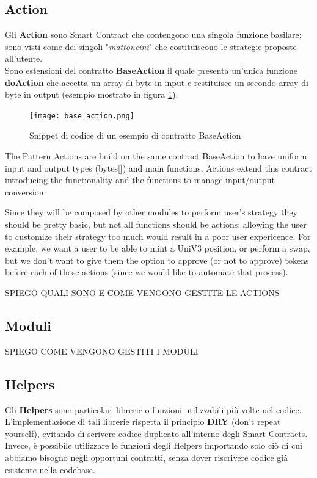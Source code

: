 \documentclass[12pt,a4paper]{report}
\begin{document}
\subsection{Action}

Gli \textbf{Action} sono Smart Contract che contengono una singola funzione basilare; sono visti come dei singoli "\textit{mattoncini}" che costituiscono le strategie proposte all'utente.
\\Sono estensioni del contratto \textbf{BaseAction} il quale presenta un'unica funzione \textbf{doAction} che accetta un array di byte in input e restituisce un secondo array di byte in output (esempio mostrato in figura \ref{fig:base_action}).

\begin{figure}[H]
  \texttt{[image: base\_action.png]}
  \centering
  \caption{Snippet di codice di un esempio di contratto BaseAction}
  \label{fig:base_action}
\end{figure}



The Pattern
Actions are build on the same contract BaseAction to have uniform input and output types (bytes[]) and main functions. Actions extend this contract introducing the functionality and the functions to manage input/output conversion.

Since they will be composed by other modules to perform user's strategy they should be pretty basic, but not all functions should be actions: allowing the user to customize their strategy too much would result in a poor user expericence. For example, we want a user to be able to mint a UniV3 position, or perform a swap, but we don't want to give them the option to approve (or not to approve) tokens before each of those actions (since we would like to automate that process).

SPIEGO QUALI SONO E COME VENGONO GESTITE LE ACTIONS

\subsection{Moduli}

SPIEGO COME VENGONO GESTITI I MODULI

\subsection{Helpers}

Gli \textbf{Helpers} sono particolari librerie o funzioni utilizzabili più volte nel codice.
L'implementazione di tali librerie rispetta il principio \textbf{DRY} (don't repeat yourself), evitando di scrivere codice duplicato all'interno degli Smart Contracts.
\\Invece, è possibile utilizzare le funzioni degli Helpers importando solo ciò di cui abbiamo bisogno negli opportuni contratti, senza dover riscrivere codice già esistente nella codebase.
\end{document}
